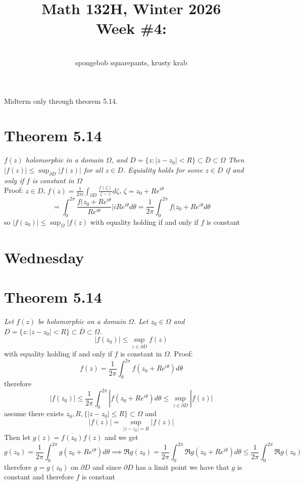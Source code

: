 \documentclass[11pt]{article}
\newcommand{\cnum}{Math 132H}
\newcommand{\ced}{Winter 2026}
\newcommand{\ctitle}[4]{\title{\vspace{-0.5in}\cnum, \ced\\Week #1: #2}\author{\vspace{-0.35in}\\#3, #4}}
\begin{document}
\ctitle{\#4}{}{spongebob squarepants}{krusty krab}
\date{}
\maketitle
Midterm only through theorem 5.14.
\section{Theorem 5.14}
\emph{
    $f(z)$ holomorphic in a domain $\Omega$, and  $D = \{z : |z-z_0| < R\} \subset  \overline{D} \subset \Omega$ 
    Then $|f(z)| \le \sup_{\partial D} |f(z)|$ for all $z \in D$. Equiality holds for some  $z \in D$ if and only if $f$ is constant in $\Omega$
}\\
Proof: $z \in D$,  $f(z) = \frac{1}{2\pi i} \int_{\partial D}^{}\frac{f(\zeta)}{\zeta - z}d\zeta$, $\zeta = z_0 + Re^{i \theta}$ 
\[
    = \int_{0}^{2\pi} \frac{f(z_0+ Re^{i\theta}}{R e^{i\theta}}|iR e^{i \theta}d \theta =\frac{1}{2\pi} \int_{0}^{2\pi}f(z_0+ Re^{i \theta} d \theta
\] 
so $|f(z_0)| \le \sup_{\Omega} |f(z)$ with equality holding if and only if $f$ is constant

\section{Wednesday}

\section{Theorem 5.14}
\emph{
    Let $f(z)$ be holomorphic on a domain $\Omega$. Let $z_0 \in \Omega$ and $D = \{z : |z-z_0| < R\} \subset \overline{ D} \subset \Omega$.
    \[
        |f(z_0)| \le \sup_{z \in \partial D} f(z)
    \] 
}
with equality holding if and only if $f$ is constant in $\Omega$.
Proof:
\[
f(z) = \frac{1}{2\pi } \int_{0}^{2\pi} f(z_0 + Re^{i\theta}) d \theta
\] 
therefore
\[
    |f(z_0)| \le \frac{1}{2\pi}\int_{0}^{2\pi}| f(z_0 + Re^{i\theta}) d \theta \le \sup_{z \in  \partial D} |f(z)|
\] 
assume there exists $z_0, R, \{|z-z_0| \le R\} \subset \Omega$ and
\[
    |f(z)| = \sup_{|z-z_0| = R}|f(z)|
\] 
Then let $g(z) = \overline{f(z_0)}f(z)$ and we get
\[
g(z_0) = \frac{1}{2\pi} \int_{0}^{2\pi}g(z_0 + Re^{i\theta}) d \theta \implies \Re g(z_0) =  \frac{1}{2\pi}\int_{0}^{2\pi}\Re g(z_0 + Re^{i\theta}) d \theta \le \frac{1}{2\pi} \int_{0}^{2\pi} \Re g(z_0)
\] 
therefore $g = g(z_0)$ on $\partial D$ and since $\partial D$ has a limit point we have that $g$ is constant and therefore  $f$ is constant
\end{document}
